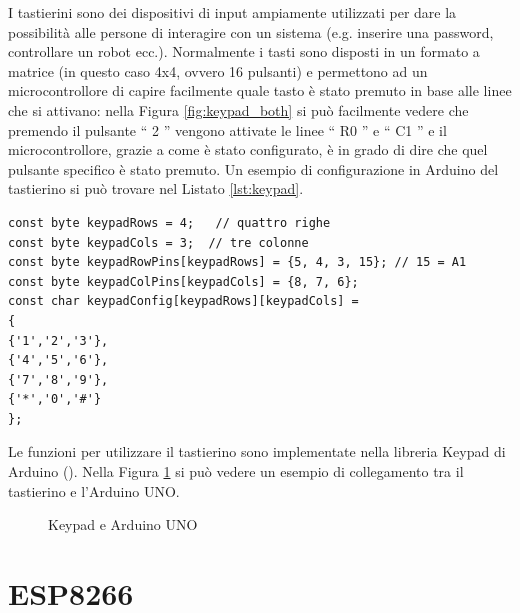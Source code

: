 \documentclass[12pt]{report}
\begin{document}
I tastierini sono dei dispositivi di input ampiamente utilizzati per dare la possibilità alle persone di interagire con un sistema (e.g$.$ inserire una password, controllare un robot ecc.). Normalmente i tasti sono disposti in un formato a matrice (in questo caso 4x4, ovvero 16 pulsanti) e permettono ad un microcontrollore di capire facilmente quale tasto è stato premuto in base alle linee che si attivano: nella Figura \ref{fig:keypad_both} si può facilmente vedere che premendo il pulsante \textquotedblleft{} 2 \textquotedblright{} vengono attivate le linee \textquotedblleft{} R0 \textquotedblright{} e \textquotedblleft{} C1 \textquotedblright{} e il microcontrollore, grazie a come è stato configurato, è in grado di dire che quel pulsante specifico è stato premuto. Un esempio di configurazione in Arduino del tastierino si può trovare nel Listato \ref{lst:keypad}. 
\begin{lstlisting}[caption={Configurazione dei pin del tastierino. In questo caso non viene utilizzata l'ultima colonna con le lettere.}, label={lst:keypad}]
const byte keypadRows = 4;   // quattro righe
const byte keypadCols = 3;  // tre colonne
const byte keypadRowPins[keypadRows] = {5, 4, 3, 15}; // 15 = A1
const byte keypadColPins[keypadCols] = {8, 7, 6};
const char keypadConfig[keypadRows][keypadCols] =
{
{'1','2','3'},
{'4','5','6'},
{'7','8','9'},
{'*','0','#'}
};
\end{lstlisting}

Le funzioni per utilizzare il tastierino sono implementate nella libreria Keypad di Arduino (\cite{keypad_lib}). Nella Figura \ref{fig:keypad_uno} si può vedere un esempio di collegamento tra il tastierino e l'Arduino UNO.


\begin{figure}[H]
	\caption{Keypad e Arduino UNO}
	\label{fig:keypad_uno}
\end{figure}


%
\section{ESP8266}\label{sec:esp8266}
%
\end{document}

